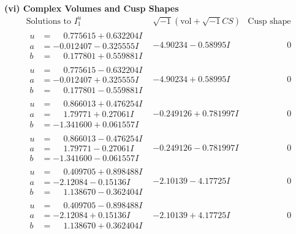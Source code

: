 \documentclass[1p]{elsarticle_modified}
\theoremstyle{definition}
\newcommand{\I}{\sqrt{-1}}
\begin{document}
\newpage\flushleft \textbf{(vi) Complex Volumes and Cusp Shapes}
$$\begin{array}{c|c|c}  
\text{Solutions to }I^u_{1}& \I (\text{vol} + \sqrt{-1}CS) & \text{Cusp shape}\\
 \hline 
\begin{aligned}
u &= \phantom{-}0.775615 + 0.632204 I \\
a &= -0.012407 - 0.325555 I \\
b &= \phantom{-}0.177801 + 0.559881 I\end{aligned}
 & -4.90234 - 0.58995 I & \phantom{-0.000000 } 0 \\ \hline\begin{aligned}
u &= \phantom{-}0.775615 - 0.632204 I \\
a &= -0.012407 + 0.325555 I \\
b &= \phantom{-}0.177801 - 0.559881 I\end{aligned}
 & -4.90234 + 0.58995 I & \phantom{-0.000000 } 0 \\ \hline\begin{aligned}
u &= \phantom{-}0.866013 + 0.476254 I \\
a &= \phantom{-}1.79771 + 0.27061 I \\
b &= -1.341600 + 0.061557 I\end{aligned}
 & -0.249126 + 0.781997 I & \phantom{-0.000000 } 0 \\ \hline\begin{aligned}
u &= \phantom{-}0.866013 - 0.476254 I \\
a &= \phantom{-}1.79771 - 0.27061 I \\
b &= -1.341600 - 0.061557 I\end{aligned}
 & -0.249126 - 0.781997 I & \phantom{-0.000000 } 0 \\ \hline\begin{aligned}
u &= \phantom{-}0.409705 + 0.898488 I \\
a &= -2.12084 - 0.15136 I \\
b &= \phantom{-}1.138670 - 0.362404 I\end{aligned}
 & -2.10139 - 4.17725 I & \phantom{-0.000000 } 0 \\ \hline\begin{aligned}
u &= \phantom{-}0.409705 - 0.898488 I \\
a &= -2.12084 + 0.15136 I \\
b &= \phantom{-}1.138670 + 0.362404 I\end{aligned}
 & -2.10139 + 4.17725 I & \phantom{-0.000000 } 0 \\ \hline\begin{aligned}

\end{aligned}
\end{array}$$
\end{document}
